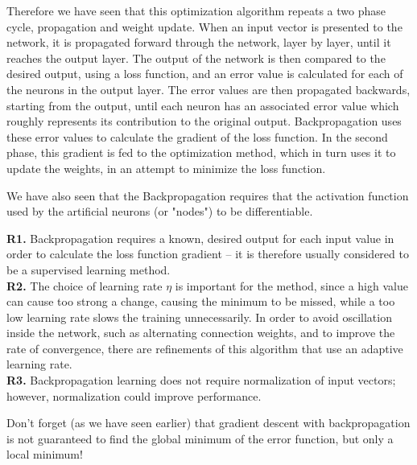 	Therefore we have seen that this optimization algorithm repeats a two phase cycle, propagation and weight update. When an input vector is presented to the network, it is propagated forward through the network, layer by layer, until it reaches the output layer. The output of the network is then compared to the desired output, using a loss function, and an error value is calculated for each of the neurons in the output layer. The error values are then propagated backwards, starting from the output, until each neuron has an associated error value which roughly represents its contribution to the original output. Backpropagation uses these error values to calculate the gradient of the loss function. In the second phase, this gradient is fed to the optimization method, which in turn uses it to update the weights, in an attempt to minimize the loss function.
	
	We have also seen that the Backpropagation requires that the activation function used by the artificial neurons (or "nodes") to be differentiable.
	
	\begin{tcolorbox}[title=Remark,colframe=black,arc=10pt]
	\textbf{R1.} Backpropagation requires a known, desired output for each input value in order to calculate the loss function gradient – it is therefore usually considered to be a supervised learning method.\\
	
	\textbf{R2.} The choice of learning rate $\eta$ is important for the method, since a high value can cause too strong a change, causing the minimum to be missed, while a too low learning rate slows the training unnecessarily. In order to avoid oscillation inside the network, such as alternating connection weights, and to improve the rate of convergence, there are refinements of this algorithm that use an adaptive learning rate.\\
	
	\textbf{R3.} Backpropagation learning does not require normalization of input vectors; however, normalization could improve performance.
	\end{tcolorbox}
	Don't forget (as we have seen earlier) that gradient descent with backpropagation is not guaranteed to find the global minimum of the error function, but only a local minimum!
	
	\pagebreak
